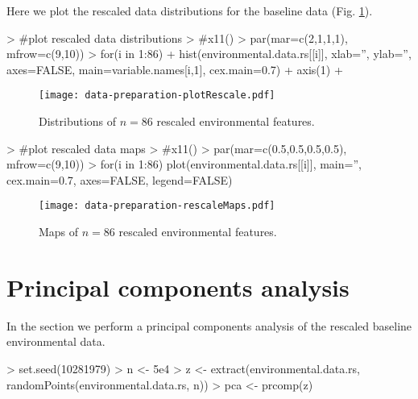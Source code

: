 \documentclass[10pt]{article}
\renewenvironment{Schunk}{\vspace{\topsep}}{\vspace{\topsep}}
\begin{document}
Here we plot the rescaled data distributions for the baseline data (Fig. \ref{fig:scaled-histograms}).

\begin{Schunk}
\begin{Sinput}
> #plot rescaled data distributions
> #x11()
> par(mar=c(2,1,1,1), mfrow=c(9,10))
> for(i in 1:86){
+   hist(environmental.data.rs[[i]], xlab='', ylab='', axes=FALSE, main=variable.names[i,1], cex.main=0.7)
+   axis(1)
+ }
\end{Sinput}
\end{Schunk}
% 
\begin{figure}
  \begin{center}
    \texttt{[image: data-preparation-plotRescale.pdf]}
    \caption{Distributions of $n=86$ rescaled environmental features.}  
    \label{fig:scaled-histograms}
  \end{center}
\end{figure}

\begin{Schunk}
\begin{Sinput}
> #plot rescaled data maps
> #x11()
> par(mar=c(0.5,0.5,0.5,0.5), mfrow=c(9,10))
> for(i in 1:86) plot(environmental.data.rs[[i]], main='', cex.main=0.7, axes=FALSE, legend=FALSE)
\end{Sinput}
\end{Schunk}

\begin{figure}
  \begin{center}
    \texttt{[image: data-preparation-rescaleMaps.pdf]}
    \caption{Maps of $n=86$ rescaled environmental features.}  
    \label{fig:scaled-maps}
  \end{center}
\end{figure}

\section{Principal components analysis}

In the section we perform a principal components analysis of the rescaled baseline environmental data.

\begin{Schunk}
\begin{Sinput}
> set.seed(10281979)
> n <- 5e4
> z <- extract(environmental.data.rs, randomPoints(environmental.data.rs, n))
> pca <- prcomp(z)
\end{Sinput}
\end{Schunk}
\end{document}
